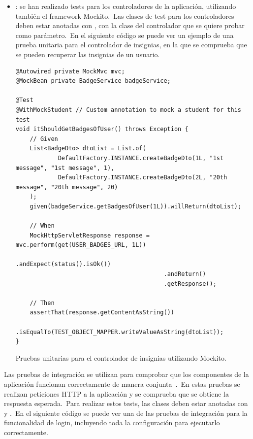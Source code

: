 \begin{itemize}
	\item {}: se han realizado tests para los controladores de la aplicación, utilizando también
	el framework Mockito.\ Las clases de test para los controladores deben estar anotadas con ,
	con la clase del controlador que se quiere probar como parámetro.\ En el siguiente código se puede ver un ejemplo
	de una prueba unitaria para el controlador de insignias, en la que se comprueba que se pueden recuperar las
	insignias de un usuario.
	\begin{codeBlock}
		\begin{verbatim}
@Autowired private MockMvc mvc;
@MockBean private BadgeService badgeService;

@Test
@WithMockStudent // Custom annotation to mock a student for this test
void itShouldGetBadgesOfUser() throws Exception {
	// Given
	List<BadgeDto> dtoList = List.of(
			DefaultFactory.INSTANCE.createBadgeDto(1L, "1st message", "1st message", 1),
			DefaultFactory.INSTANCE.createBadgeDto(2L, "20th message", "20th message", 20)
	);
	given(badgeService.getBadgesOfUser(1L)).willReturn(dtoList);

	// When
	MockHttpServletResponse response = mvc.perform(get(USER_BADGES_URL, 1L))
	                                      .andExpect(status().isOk())
	                                      .andReturn()
	                                      .getResponse();

	// Then
	assertThat(response.getContentAsString())
			.isEqualTo(TEST_OBJECT_MAPPER.writeValueAsString(dtoList));
}
		\end{verbatim}
		\caption{Pruebas unitarias para el controlador de insignias utilizando Mockito.}
		\label{code:pruebas-unitarias-controlador}
	\end{codeBlock}

\end{itemize}
\label{itm:pruebas-unitarias-backend}


Las pruebas de integración se utilizan para comprobar que los componentes de la aplicación funcionan correctamente
de manera conjunta~\cite{integration_testing}.\ En estas pruebas se realizan peticiones HTTP a la aplicación y se
comprueba que se obtiene la respuesta esperada.\ Para realizar estos tests, las clases deben estar
anotadas con  y .\ En el siguiente código se puede ver
una de las pruebas de integración para la funcionalidad de login, incluyendo toda la configuración para ejecutarlo
correctamente.

